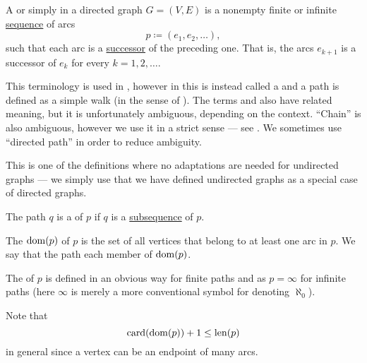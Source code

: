 \begin{definition}\label{def:graph_directed_path}
  A  or simply  in a directed graph \( G = (V, E) \) is a nonempty finite or infinite \hyperref[def:sequence]{sequence} of arcs
  \begin{equation*}
    p \coloneqq (e_1, e_2, \ldots),
  \end{equation*}
  such that each arc is a \hyperref[def:graph/adjacency]{successor} of the preceding one. That is, the arcs \( e_{k+1} \) is a successor of \( e_k \) for every \( k = 1, 2, \ldots \).

  This terminology is used in , however in \cite[sec. 5.2]{Erickson2019} this is instead called a  and a path is defined as a simple walk (in the sense of ). The terms  and  also have related meaning, but it is unfortunately ambiguous, depending on the context. \enquote{Chain} is also ambiguous, however we use it in a strict sense --- see . We sometimes use \enquote{directed path} in order to reduce ambiguity.

  This is one of the definitions where no adaptations are needed for undirected graphs --- we simply use that we have defined undirected graphs as a special case of directed graphs.

  \begin{thmenum}
     The path \( q \) is a  of \( p \) if \( q \) is a \hyperref[def:subsequence]{subsequence} of \( p \).

     The  \( \operatorname{dom}(p) \) of \( p \) is the set of all vertices that belong to at least one arc in \( p \). We say that the path  each member of \( \operatorname{dom}(p) \).

     The  of \( p \) is defined in an obvious way for finite paths and as \( p = \infty \) for infinite paths (here \( \infty \) is merely a more conventional symbol for denoting \hyperref[thm:omega_is_a_cardinal]{\( \aleph_0 \)}).

    Note that
    \begin{equation}\label{eq:def:graph_directed_path/length_and_domain}
      \operatorname{card}(\operatorname{dom}(p)) + 1 \leq \operatorname{len}(p)
    \end{equation}
    in general since a vertex can be an endpoint of many arcs.


\end{thmenum}
\end{definition}
